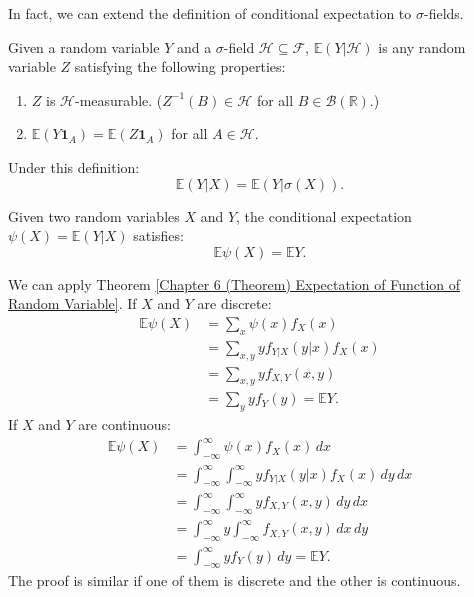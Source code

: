 \documentclass{huhtakm-template-book-v2}
\newcommand{\expect}{\mathbb{E}}
\begin{document}
    In fact, we can extend the definition of conditional expectation to $\sigma$-fields.
    \begin{defn}
        Given a random variable $Y$ and a $\sigma$-field $\mathcal{H}\subseteq\mathcal{F}$, $\expect(Y|\mathcal{H})$ is any random variable $Z$ satisfying the following properties:
        \begin{enumerate}
            \item $Z$ is $\mathcal{H}$-measurable. ($Z^{-1}(B) \in \mathcal{H}$ for all $B \in \mathcal{B}(\mathbb{R})$.)
            \item $\expect(Y\mathbf{1}_{A}) = \expect(Z\mathbf{1}_{A})$ for all $A \in \mathcal{H}$.
        \end{enumerate}
    \end{defn}
    \begin{rem}
        Under this definition:
        \begin{equation*}
            \expect(Y|X) = \expect(Y|\sigma(X)).
        \end{equation*}
    \end{rem}
    \begin{thm}
        \label{Chapter 6 (Theorem) Law of Total Expectation}
        Given two random variables $X$ and $Y$, the conditional expectation $\psi(X) = \expect(Y|X)$ satisfies:
        \begin{equation*}
            \expect{\psi(X)} = \expect{Y}.
        \end{equation*}
    \end{thm}
    \begin{proofing}
        We can apply Theorem \ref{Chapter 6 (Theorem) Expectation of Function of Random Variable}. If $X$ and $Y$ are discrete:
        \begin{align*}
            \expect{\psi(X)} &= \sum_{x}\psi(x)f_{X}(x)\\
            &= \sum_{x,y}yf_{Y|X}(y|x)f_{X}(x)\\
            &= \sum_{x,y}yf_{X,Y}(x, y)\\
            &= \sum_{y}yf_{Y}(y) = \expect{Y}.
        \end{align*}
        If $X$ and $Y$ are continuous:
        \begin{align*}
            \expect{\psi(X)} &= \int_{-\infty}^{\infty}\psi(x)f_{X}(x)\,dx\\
            &= \int_{-\infty}^{\infty}\int_{-\infty}^{\infty} yf_{Y|X}(y|x)f_{X}(x)\,dy\,dx\\
            &= \int_{-\infty}^{\infty}\int_{-\infty}^{\infty} yf_{X,Y}(x, y)\,dy\,dx\\
            &= \int_{-\infty}^{\infty} y\int_{-\infty}^{\infty} f_{X,Y}(x, y)\,dx\,dy\\
            &= \int_{-\infty}^{\infty} yf_{Y}(y)\,dy = \expect{Y}.
        \end{align*}
        The proof is similar if one of them is discrete and the other is continuous.
    \end{proofing}
\end{document}
